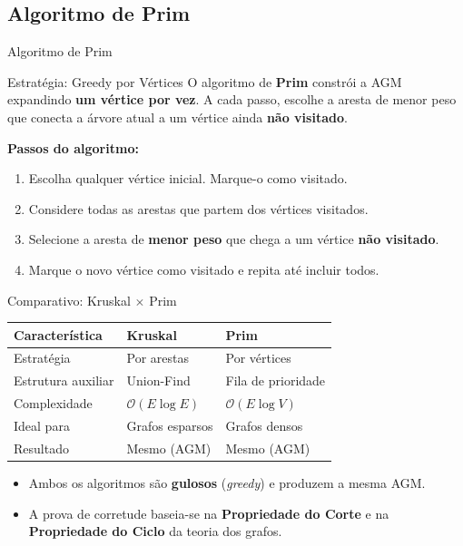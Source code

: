 \documentclass[9pt]{beamer}
\begin{document}
\subsection{Algoritmo de Prim}
\begin{frame}{Algoritmo de Prim}
    \begin{block}{Estratégia: Greedy por Vértices}
        O algoritmo de \textbf{Prim} constrói a AGM expandindo \textbf{um vértice por vez}. A cada passo, escolhe a aresta de menor peso que conecta a árvore atual a um vértice ainda \textbf{não visitado}.
    \end{block}
    \vspace{0.3cm} 
    \textbf{Passos do algoritmo:}
    \begin{enumerate}
        \item Escolha qualquer vértice inicial. Marque-o como visitado.
        \item Considere todas as arestas que partem dos vértices visitados.
        \item Selecione a aresta de \textbf{menor peso} que chega a um vértice \textbf{não visitado}.
        \item Marque o novo vértice como visitado e repita até incluir todos.
    \end{enumerate}
\end{frame}

\begin{frame}{Comparativo: Kruskal $\times$ Prim}
    \begin{center}
    \begin{tabular}{|l|l|l|}
        \hline
        \textbf{Característica} & \textbf{Kruskal} & \textbf{Prim} \\
        \hline
        Estratégia & Por arestas & Por vértices \\
        \hline
        Estrutura auxiliar & Union-Find & Fila de prioridade \\
        \hline
        Complexidade & $\mathcal{O}(E \log E)$ & $\mathcal{O}(E \log V)$ \\
        \hline
        Ideal para & Grafos esparsos & Grafos densos \\
        \hline
        Resultado & Mesmo (AGM) & Mesmo (AGM) \\
        \hline
    \end{tabular}
    \end{center}
    \vspace{0.4cm}
    \begin{itemize}
        \item Ambos os algoritmos são \textbf{gulosos} (\textit{greedy}) e produzem a mesma AGM.
        \item A prova de corretude baseia-se na \textbf{Propriedade do Corte} e na \textbf{Propriedade do Ciclo} da teoria dos grafos.
    \end{itemize}
\end{frame}
\end{document}
